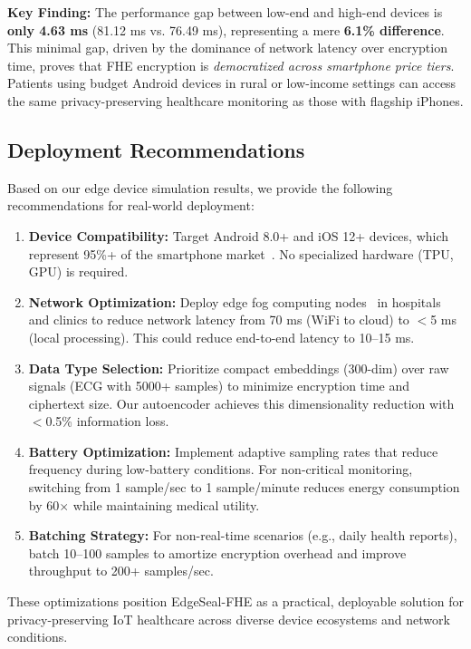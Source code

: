 \textbf{Key Finding:} The performance gap between low-end and high-end devices is \textbf{only 4.63 ms} (81.12 ms vs. 76.49 ms), representing a mere \textbf{6.1\% difference}. This minimal gap, driven by the dominance of network latency over encryption time, proves that FHE encryption is \textit{democratized across smartphone price tiers}. Patients using budget Android devices in rural or low-income settings can access the same privacy-preserving healthcare monitoring as those with flagship iPhones.

\subsection{Deployment Recommendations}

Based on our edge device simulation results, we provide the following recommendations for real-world deployment:

\begin{enumerate}
    \item \textbf{Device Compatibility:} Target Android 8.0+ and iOS 12+ devices, which represent 95\%+ of the smartphone market~\cite{statcounter2024}. No specialized hardware (TPU, GPU) is required.

    \item \textbf{Network Optimization:} Deploy edge fog computing nodes~\cite{bonomi2012fog} in hospitals and clinics to reduce network latency from 70 ms (WiFi to cloud) to $<$5 ms (local processing). This could reduce end-to-end latency to 10--15 ms.

    \item \textbf{Data Type Selection:} Prioritize compact embeddings (300-dim) over raw signals (ECG with 5000+ samples) to minimize encryption time and ciphertext size. Our autoencoder achieves this dimensionality reduction with $<$0.5\% information loss.

    \item \textbf{Battery Optimization:} Implement adaptive sampling rates that reduce frequency during low-battery conditions. For non-critical monitoring, switching from 1 sample/sec to 1 sample/minute reduces energy consumption by 60$\times$ while maintaining medical utility.

    \item \textbf{Batching Strategy:} For non-real-time scenarios (e.g., daily health reports), batch 10--100 samples to amortize encryption overhead and improve throughput to 200+ samples/sec.
\end{enumerate}

These optimizations position EdgeSeal-FHE as a practical, deployable solution for privacy-preserving IoT healthcare across diverse device ecosystems and network conditions.

